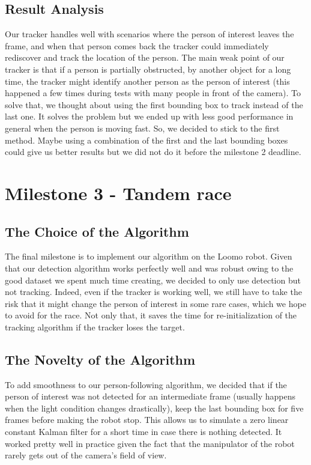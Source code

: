 \documentclass[10pt,conference,compsocconf]{IEEEtran}
\begin{document}
\subsection{Result Analysis}
Our tracker handles well with scenarios where the person of interest leaves the frame, and when that person comes back the tracker could immediately rediscover and track the location of the person. The main weak point of our tracker is that if a person is partially obstructed, by another object for a long time, the tracker might identify another person as the person of interest (this happened a few times during tests with many people in front of the camera). To solve that, we thought about using the first bounding box to track instead of the last one. It solves the problem but we ended up with less good performance in general when the person is moving fast. So, we decided to stick to the first method. Maybe using a combination of the first and the last bounding boxes could give us better results but we did not do it before the milestone 2 deadline.

\section{Milestone 3 - Tandem race}
\subsection{The Choice of the Algorithm}
The final milestone is to implement our algorithm on the Loomo robot.
Given that our detection algorithm works perfectly well and was robust owing to the good dataset we spent much time creating, we decided to only use detection but not tracking. Indeed, even if the tracker is working well, we still have to take the risk that it might change the person of interest in some rare cases, which we hope to avoid for the race. 
Not only that, it saves the time for re-initialization of the tracking algorithm if the tracker loses the target.

\subsection{The Novelty of the Algorithm}
To add smoothness to our person-following algorithm, we decided that if the person of interest was not detected for an intermediate frame (usually happens when the light condition changes drastically), keep the last bounding box for five frames before making the robot stop. This allows us to simulate a zero linear constant Kalman filter for a short time in case there is nothing detected. It worked pretty well in practice given the fact that the manipulator of the robot rarely gets out of the camera's field of view.
\end{document}
